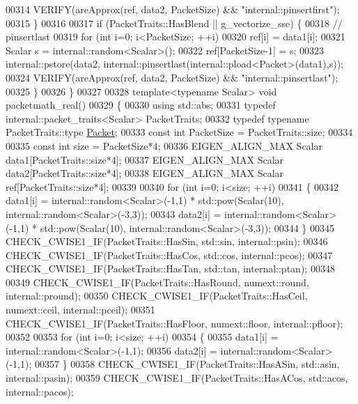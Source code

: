 \begin{DoxyCode}
00314     VERIFY(areApprox(ref, data2, PacketSize) && \textcolor{stringliteral}{"internal::pinsertfirst"});
00315   \}
00316 
00317   \textcolor{keywordflow}{if} (PacketTraits::HasBlend || g\_vectorize\_sse) \{
00318     \textcolor{comment}{// pinsertlast}
00319     \textcolor{keywordflow}{for} (\textcolor{keywordtype}{int} i=0; i<PacketSize; ++i)
00320       ref[i] = data1[i];
00321     Scalar s = internal::random<Scalar>();
00322     ref[PacketSize-1] = s;
00323     internal::pstore(data2, internal::pinsertlast(internal::pload<Packet>(data1),s));
00324     VERIFY(areApprox(ref, data2, PacketSize) && \textcolor{stringliteral}{"internal::pinsertlast"});
00325   \}
00326 \}
00327 
00328 \textcolor{keyword}{template}<\textcolor{keyword}{typename} Scalar> \textcolor{keywordtype}{void} packetmath\_real()
00329 \{
00330   \textcolor{keyword}{using} std::abs;
00331   \textcolor{keyword}{typedef} internal::packet\_traits<Scalar> PacketTraits;
00332   \textcolor{keyword}{typedef} \textcolor{keyword}{typename} PacketTraits::type \hyperlink{group___sparse_core___module}{Packet};
00333   \textcolor{keyword}{const} \textcolor{keywordtype}{int} PacketSize = PacketTraits::size;
00334 
00335   \textcolor{keyword}{const} \textcolor{keywordtype}{int} size = PacketSize*4;
00336   EIGEN\_ALIGN\_MAX Scalar data1[PacketTraits::size*4];
00337   EIGEN\_ALIGN\_MAX Scalar data2[PacketTraits::size*4];
00338   EIGEN\_ALIGN\_MAX Scalar ref[PacketTraits::size*4];
00339 
00340   \textcolor{keywordflow}{for} (\textcolor{keywordtype}{int} i=0; i<size; ++i)
00341   \{
00342     data1[i] = internal::random<Scalar>(-1,1) * std::pow(Scalar(10), internal::random<Scalar>(-3,3));
00343     data2[i] = internal::random<Scalar>(-1,1) * std::pow(Scalar(10), internal::random<Scalar>(-3,3));
00344   \}
00345   CHECK\_CWISE1\_IF(PacketTraits::HasSin, std::sin, internal::psin);
00346   CHECK\_CWISE1\_IF(PacketTraits::HasCos, std::cos, internal::pcos);
00347   CHECK\_CWISE1\_IF(PacketTraits::HasTan, std::tan, internal::ptan);
00348 
00349   CHECK\_CWISE1\_IF(PacketTraits::HasRound, numext::round, internal::pround);
00350   CHECK\_CWISE1\_IF(PacketTraits::HasCeil, numext::ceil, internal::pceil);
00351   CHECK\_CWISE1\_IF(PacketTraits::HasFloor, numext::floor, internal::pfloor);
00352 
00353   \textcolor{keywordflow}{for} (\textcolor{keywordtype}{int} i=0; i<size; ++i)
00354   \{
00355     data1[i] = internal::random<Scalar>(-1,1);
00356     data2[i] = internal::random<Scalar>(-1,1);
00357   \}
00358   CHECK\_CWISE1\_IF(PacketTraits::HasASin, std::asin, internal::pasin);
00359   CHECK\_CWISE1\_IF(PacketTraits::HasACos, std::acos, internal::pacos);

\end{DoxyCode}
